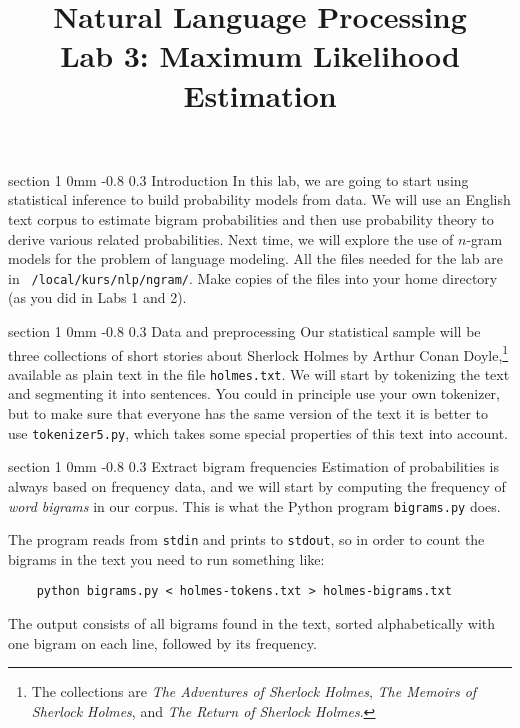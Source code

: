 \documentclass[11pt]{article}
\title{{\LARGE Natural Language Processing}\\[1.5mm]{\large Lab 3: Maximum Likelihood Estimation}}
\author{}
\date{} %
\makeatletter
\newcommand{\newsec}[2]{\section{#1}\label{sec:#2}\noindent}
\renewcommand{\section}{\@startsection
{section}%
{1}%
{0mm}%
{-0.8\baselineskip}%
{0.3\baselineskip}%
{\bfseries\large}}%
\makeatother
\begin{document}
 

\maketitle
\vspace{-2mm} \newsec{Introduction}{intro}%
In this lab, we are going to start using statistical inference
to build probability models from data.  We will use an English text
corpus to estimate bigram probabilities and then use probability
theory to derive various related probabilities. Next time, we will
explore the use of $n$-gram models for the problem of language
modeling. All the files needed for the lab are in {\tt
  /local/kurs/nlp/ngram/}. Make copies of the files into your home
directory (as you did in Labs 1 and 2).

\newsec{Data and preprocessing}{data}%
Our statistical sample will be three collections of short stories
about Sherlock Holmes by Arthur Conan Doyle,\footnote{The collections
  are {\em The Adventures of Sherlock Holmes}, {\em The Memoirs of
    Sherlock Holmes}, and {\em The Return of Sherlock Holmes}.}
available as plain text in the file {\tt holmes.txt}. We will start by
tokenizing the text and segmenting it into sentences.  You could in
principle use your own tokenizer, but to make sure that everyone has
the same version of the text it is better to use {\tt tokenizer5.py},
which takes some special properties of this text into account.

\newsec{Extract bigram frequencies }{bigrams}%
Estimation of probabilities is always based on frequency data, and we
will start by computing the frequency of \emph{word bigrams} in our
corpus. This is what the Python program {\tt bigrams.py} does.

\begin{center}
\fbox{

}
\end{center}
\newpage
\noindent
The program reads from {\tt stdin} and prints to {\tt stdout}, so in
order to count the bigrams in the text you need to run something like:
\begin{verbatim}
    python bigrams.py < holmes-tokens.txt > holmes-bigrams.txt
\end{verbatim}
The output consists of all bigrams found in the text, sorted
alphabetically with one bigram on each line, followed by its
frequency.
\end{document}
